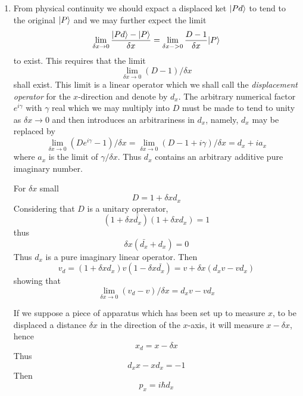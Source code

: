 \begin{enumerate}
	\item From physical continuity we should expact a displaced ket $| Pd \rangle$ to tend to the original $| P \rangle$ and we may further expect the limit
	\begin{equation}
	\lim_{\delta x \rightarrow 0} \frac{| Pd \rangle - | P \rangle}{\delta x} = \lim_{\delta x-> 0} \frac{D-1}{\delta x} | P \rangle
	\end{equation}
	to exist. This requires that the limit
	\begin{equation}
	\lim_{\delta x \rightarrow 0} (D-1) / \delta x
	\end{equation}
	shall exist. This limit is a linear operator which we shall call the \emph{displacement operator} for the $x$-direction and denote by $d_x$. The arbitrary numerical factor $e^{i\gamma}$ with $\gamma$ real which we may multiply into $D$ must be made to tend to unity as $\delta x \rightarrow 0$ and then introduces an arbitrariness in $d_x$, namely, $d_x$ may be replaced by
	\begin{equation}
	\lim_{\delta x \rightarrow 0} (D e^{i\gamma}-1) /\delta x = \lim_{\delta x \rightarrow 0} (D -1+i \gamma) /\delta x=d_x + ia_x
	\end{equation}
	where $a_x$ is the limit of $\gamma/\delta x$. Thus $d_x$ contains an arbitrary additive pure imaginary number.

	For $\delta x$ small 
	\begin{equation}
	D=1+\delta x d_x
	\end{equation}
	Considering that $D$ is a unitary oprerator,
	\begin{equation}
	(1+\delta x \bar{d_x})(1+\delta x d_x) = 1
	\end{equation}
	thus 
	\begin{equation}
	\delta x (\bar{d_x} + d_x) =0
	\end{equation}
	Thus $d_x$ is a pure imaginary linear operator. Then
	\begin{equation}
	v_d = (1+\delta x d_x)v(1-\delta x \bar{d_x})=v+\delta x (d_x v -v d_x)
	\end{equation}
	showing that
	\begin{equation}
	\lim_{\delta x \rightarrow 0} (v_d -v) /\delta x = d_x v - v d_x
	\end{equation}

	If we suppose a piece of apparatus which has been set up to measure $x$, to be displaced a distance $\delta x$ in the direction of the $x$-axis, it will measure $x-\delta x$, hence 
	\begin{equation}
	x_d=x-\delta x
	\end{equation}
	Thus
	\begin{equation}
	d_x x - x d_x = -1
	\end{equation}
	Then
	\begin{equation}
	p_x = i\hbar d_x
	\end{equation}

\end{enumerate} 

